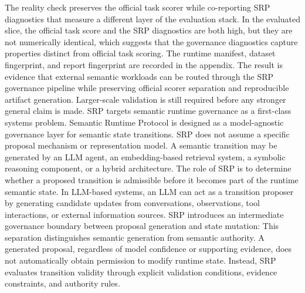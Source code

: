 {}The reality check preserves the official task scorer while co-reporting SRP diagnostics that measure a different layer of the evaluation stack. In the evaluated slice, the official task score and the SRP diagnostics are both high, but they are not numerically identical, which suggests that the governance diagnostics capture properties distinct from official task scoring.\markdownRendererParagraphSeparator
{}\markdownRendererInterblockSeparator
{}\markdownRendererInterblockSeparator
{}The runtime manifest, dataset fingerprint, and report fingerprint are recorded in the appendix. The result is evidence that external semantic workloads can be routed through the SRP governance pipeline while preserving official scorer separation and reproducible artifact generation. Larger-scale validation is still required before any stronger general claim is made.\markdownRendererInterblockSeparator
{}
\markdownRendererSectionEnd 
\markdownRendererSectionEnd 
\markdownRendererSectionEnd \markdownRendererSectionBegin
{}\markdownRendererInterblockSeparator
{}SRP targets semantic runtime governance as a first-class systems problem.\markdownRendererInterblockSeparator
{}\markdownRendererSectionBegin
{}\markdownRendererInterblockSeparator
{}Semantic Runtime Protocol is designed as a model-agnostic governance layer for semantic state transitions. SRP does not assume a specific proposal mechanism or representation model. A semantic transition may be generated by an LLM agent, an embedding-based retrieval system, a symbolic reasoning component, or a hybrid architecture. The role of SRP is to determine whether a proposed transition is admissible before it becomes part of the runtime semantic state.\markdownRendererParagraphSeparator
{}In LLM-based systems, an LLM can act as a transition proposer by generating candidate updates from conversations, observations, tool interactions, or external information sources. SRP introduces an intermediate governance boundary between proposal generation and state mutation:\markdownRendererInterblockSeparator
{}\markdownRendererInterblockSeparator
{}This separation distinguishes semantic generation from semantic authority. A generated proposal, regardless of model confidence or supporting evidence, does not automatically obtain permission to modify runtime state. Instead, SRP evaluates transition validity through explicit validation conditions, evidence constraints, and authority rules.\markdownRendererParagraphSeparator

